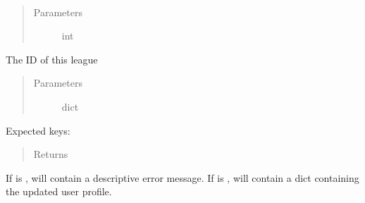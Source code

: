 \documentclass[letterpaper,10pt,english]{sphinxmanual}
\begin{document}
\begin{fulllineitems}
\label{\detokenize{tiger_leagues/models/readme:tiger_leagues.models.league_model.process_update_league_responses}}~\begin{quote}\begin{description}
\item[{Parameters}] \leavevmode
{} \textendash{} int

\end{description}\end{quote}

The ID of this league
\begin{quote}\begin{description}
\item[{Parameters}] \leavevmode
{} \textendash{} dict

\end{description}\end{quote}

Expected keys: 
\begin{quote}\begin{description}
\item[{Returns}] \leavevmode
{}

\end{description}\end{quote}

If  is ,  will contain a descriptive error 
message. If  is ,  will contain a 
dict containing the updated user profile.

\end{fulllineitems}

\end{document}
